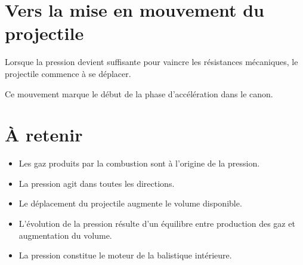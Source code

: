 \section{Vers la mise en mouvement du projectile}

Lorsque la pression devient suffisante pour vaincre les résistances
mécaniques, le projectile commence à se déplacer.

Ce mouvement marque le début de la phase d'accélération dans le canon.

\section{À retenir}

\begin{aretenir}

\begin{itemize}
    \item Les gaz produits par la combustion sont à l'origine de la pression.
    \item La pression agit dans toutes les directions.
    \item Le déplacement du projectile augmente le volume disponible.
    \item L'évolution de la pression résulte d'un équilibre entre production
          des gaz et augmentation du volume.
    \item La pression constitue le moteur de la balistique intérieure.
\end{itemize}

\end{aretenir}
